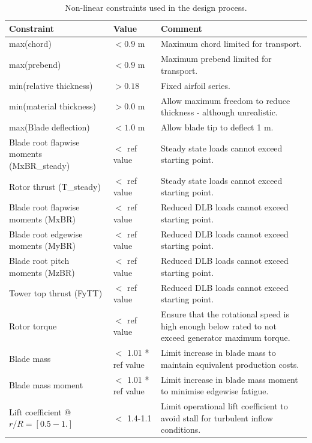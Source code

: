 \begin{table}
\centering
\small
\begin{tabular}{p{4.5cm}lp{6cm}}
\hline
\textbf{Constraint}					&	Value			& \textbf{Comment}	\\
\hline
max(chord)							&	$< 0.9$	m		&	Maximum chord limited for transport.	\\
max(prebend)							&	$< 0.9$	m		&	Maximum prebend limited for transport.	\\
min(relative thickness)				&	$> 0.18$			&	Fixed airfoil series.	\\
min(material thickness)				&	$> 0.0 $ m		&	Allow maximum freedom to reduce thickness - although unrealistic.	\\
max(Blade deflection)				&	$< 1.0$ m		&  	Allow blade tip to deflect 1 m.\\
Blade root flapwise moments (MxBR\_steady)	&	$<$ ref value	&  	Steady state loads cannot exceed starting point.\\
Rotor thrust (T\_steady)				&	$<$ ref value	&  	Steady state loads cannot exceed starting point.\\
Blade root flapwise moments (MxBR)	&	$<$ ref value	&  	Reduced DLB loads cannot exceed starting point.\\
Blade root edgewise moments (MyBR)	&	$<$ ref value	&  	Reduced DLB loads cannot exceed starting point.\\
Blade root pitch moments (MzBR)		&	$<$ ref value	&  	Reduced DLB loads cannot exceed starting point.\\
Tower top thrust (FyTT)				&	$<$ ref value	&  	Reduced DLB loads cannot exceed starting point.\\
Rotor torque							&	$<$ ref value	&  	Ensure that the rotational speed is high enough below rated to not exceed generator maximum torque.\\
Blade mass							&	$<$ 1.01 * ref value	&  	Limit increase in blade mass to maintain equivalent production costs.\\
Blade mass moment					&	$<$ 1.01 * ref value	&  	Limit increase in blade mass moment to minimise edgewise fatigue.\\
Lift coefficient @ $r/R=[0.5-1.]$	&	$<$ 1.4-1.1			&	Limit operational lift coefficient to avoid stall for turbulent inflow conditions.\\	
\hline
\end{tabular}
\caption{Non-linear constraints used in the design process.}
\label{tab:con_summary}
\end{table}

